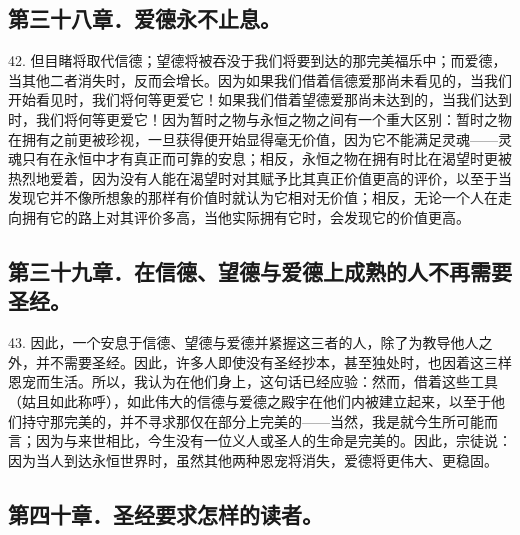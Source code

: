 
\subsection{第三十八章．爱德永不止息。}

42. 但目睹将取代信德；望德将被吞没于我们将要到达的那完美福乐中；而爱德，当其他二者消失时，反而会增长。因为如果我们借着信德爱那尚未看见的，当我们开始看见时，我们将何等更爱它！如果我们借着望德爱那尚未达到的，当我们达到时，我们将何等更爱它！因为暂时之物与永恒之物之间有一个重大区别：暂时之物在拥有之前更被珍视，一旦获得便开始显得毫无价值，因为它不能满足灵魂——灵魂只有在永恒中才有真正而可靠的安息；相反，永恒之物在拥有时比在渴望时更被热烈地爱着，因为没有人能在渴望时对其赋予比其真正价值更高的评价，以至于当发现它并不像所想象的那样有价值时就认为它相对无价值；相反，无论一个人在走向拥有它的路上对其评价多高，当他实际拥有它时，会发现它的价值更高。\par


\subsection{第三十九章．在信德、望德与爱德上成熟的人不再需要圣经。}

43. 因此，一个安息于信德、望德与爱德并紧握这三者的人，除了为教导他人之外，并不需要圣经。因此，许多人即使没有圣经抄本，甚至独处时，也因着这三样恩宠而生活。所以，我认为在他们身上，这句话已经应验：然而，借着这些工具（姑且如此称呼），如此伟大的信德与爱德之殿宇在他们内被建立起来，以至于他们持守那完美的，并不寻求那仅在部分上完美的——当然，我是就今生所可能而言；因为与来世相比，今生没有一位义人或圣人的生命是完美的。因此，宗徒说：因为当人到达永恒世界时，虽然其他两种恩宠将消失，爱德将更伟大、更稳固。\par


\subsection{第四十章．圣经要求怎样的读者。}

